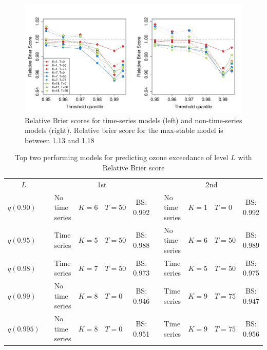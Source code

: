 \begin{figure}
  \includegraphics[width=\linewidth]{plots/bs-ozone.pdf}
  \caption{Relative Brier scores for time-series models (left) and non-time-series models (right). Relative brier score for the max-stable model is between 1.13 and 1.18}
  \label{stfig:bs-ozone}
\end{figure}
\begin{table}
  \scriptsize
  \caption{Top two performing models for predicting ozone exceedance of level $L$ with Relative Brier score}
  \label{sttbl:ozoneresults}
  \centering
  \begin{tabular}{l c l l l c c l l l c}
    \toprule
     \multicolumn{1}{c}{$L$} &\phantom{ab} & \multicolumn{4}{c}{1st} & \phantom{a} & \multicolumn{4}{c}{2nd} \\
    \cmidrule{1-1} \cmidrule{3-6} \cmidrule{8-11}
    $q(0.90)$  && No time series & $K=6$  & $T=50$  & BS: 0.992 &&
                 No time series & $K=1$  & $T=0$  & BS: 0.992 \\
    $q(0.95)$  && Time series & $K=5$ & $T=50$ & BS: 0.988 &&
                 No time series & $K=6$  & $T=50$ & BS: 0.989\\
    $q(0.98)$  && Time series & $K=7$  & $T=50$ & BS: 0.973 &&
                 Time series & $K=5$ & $T=50$ & BS: 0.975\\
    $q(0.99)$  && No time series    & $K=8$ & $T=0$ & BS: 0.946 &&
                 Time series    & $K=9$  & $T=75$ & BS: 0.947\\
    $q(0.995)$ && No time series    & $K=8$  & $T=0$ & BS: 0.951 &&
                 Time series    & $K=9$ & $T=75$ & BS: 0.956\\
    \bottomrule
  \end{tabular}
\end{table}

